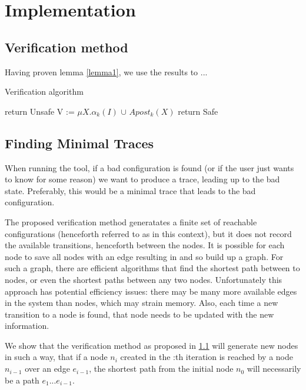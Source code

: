 
\section{Implementation}
\subsection{Verification method}
\label{alg1}
Having proven lemma \ref{lemma1}, we use the results to ... 

\begin{algorithm}
  \caption{Verification algorithm}\label{euclid}
  \begin{algorithmic}[1]
        \State return Unsafe
        \EndIf
        \State V := $\mu X.\alpha_k(I)$ $\cup$ $Apost_k(X)$
        \State return Safe     
        \EndIf
      \EndFor
\end{algorithmic}
\end{algorithm}


\subsection{Finding Minimal Traces}
When running the tool, if a bad configuration is found (or if the user just wants to know for some reason) we want to produce a trace, leading up to the bad state. Preferably, this would be a minimal trace that leads to the bad configuration.
 
The proposed verification method generatates a finite set of reachable configurations (henceforth referred to as  in this context), but it does not record the available transitions, henceforth  between the nodes. It is possible for each node  to save all nodes  with an edge resulting in  and so build up a graph. For such a graph, there are efficient algorithms that find the shortest path between to nodes, or even the shortest paths between any two nodes. Unfortunately this approach has potential efficiency issues: there may be many more available edges in the system than nodes, which may strain memory. Also, each time a new transition to a node is found, that node needs to be updated with the new information.
 
We show that the verification method as proposed in \ref{alg1} will generate new nodes in such a way, that if a node $n_{i}$ created in the :th iteration is reached by a node $n_{i-1}$ over an edge $e_{i-1}$, the shortest path from the initial node $n_0$ will necessarily be a path $e_1...e_{i-1}$.
 
